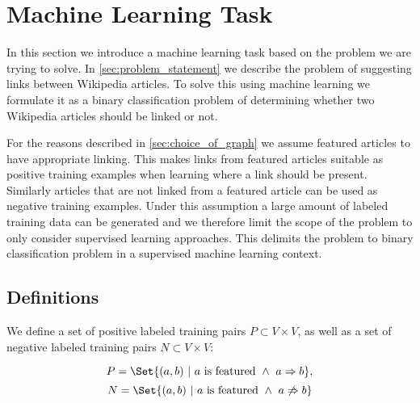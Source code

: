 \section{Machine Learning Task}\label{sec:machine_learning_task}
In this section we introduce a machine learning task based on the problem we are trying to solve. In \cref{sec:problem_statement} we describe the problem of suggesting links between Wikipedia articles. To solve this using machine learning we formulate it as a binary classification problem of determining whether two Wikipedia articles should be linked or not.

For the reasons described in \cref{sec:choice_of_graph} we assume featured articles to have appropriate linking. This makes links from featured articles suitable as positive training examples when learning where a link should be present. Similarly articles that are not linked from a featured article can be used as negative training examples.
Under this assumption a large amount of labeled training data can be generated and we therefore limit the scope of the problem to only consider supervised learning approaches. This delimits the problem to binary classification problem in a supervised machine learning context. 



\subsection{Definitions}
We define a set of positive labeled training pairs $P \subset V \times V$, as well as a set of negative labeled training pairs $N \subset V \times V$:

$$P = \Set{(a,b)\ |\ a\text{ is featured}\ \wedge\ a \Rightarrow b},$$
$$N = \Set{(a,b)\ |\ a\text{ is featured}\ \wedge\ a \not\Rightarrow b}$$


